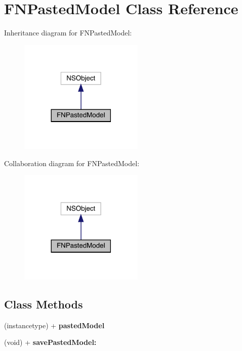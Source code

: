 \hypertarget{interface_f_n_pasted_model}{}\section{F\+N\+Pasted\+Model Class Reference}
\label{interface_f_n_pasted_model}


Inheritance diagram for F\+N\+Pasted\+Model\+:\nopagebreak
\begin{figure}[H]
\begin{center}
\leavevmode
\includegraphics[width=168pt]{interface_f_n_pasted_model__inherit__graph}
\end{center}
\end{figure}


Collaboration diagram for F\+N\+Pasted\+Model\+:\nopagebreak
\begin{figure}[H]
\begin{center}
\leavevmode
\includegraphics[width=168pt]{interface_f_n_pasted_model__coll__graph}
\end{center}
\end{figure}
\subsection*{Class Methods}
\begin{DoxyCompactItemize}
\item 
\mbox{\label{interface_f_n_pasted_model_a6aa7046431ac5cc74324cd0ef31c8a48}} 
(instancetype) + {\bfseries pasted\+Model}
\item 
\mbox{\label{interface_f_n_pasted_model_a7aaefccfdc3b1c3b6a3fc68cfa712252}} 
(void) + {\bfseries save\+Pasted\+Model\+:}
\end{DoxyCompactItemize}

